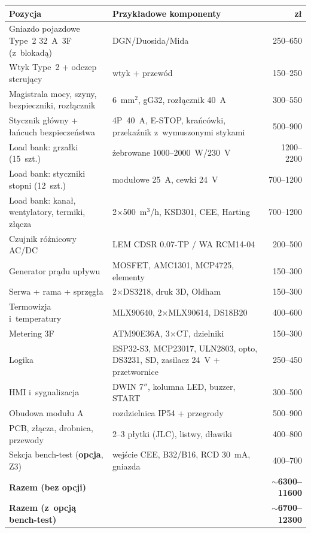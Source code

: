 \documentclass[11pt,a4paper]{article}
\begin{document}
\begin{longtable}{@{}p{}p{}r@{}}
\toprule
\textbf{Pozycja} & \textbf{Przykładowe komponenty} & \textbf{zł} \\
\midrule
\endhead
Gniazdo pojazdowe Type~2 32~A~3F (z~blokadą) & DGN/Duosida/Mida & 250--650 \\
Wtyk Type~2 + odczep sterujący & wtyk + przewód & 150--250 \\
Magistrala mocy, szyny, bezpieczniki, rozłącznik & 6~mm$^2$, gG32, rozłącznik 40~A & 300--550 \\
Stycznik główny + łańcuch bezpieczeństwa & 4P~40~A, E-STOP, krańcówki, przekaźnik z~wymuszonymi stykami & 500--900 \\
Load bank: grzałki (15~szt.) & żebrowane 1000--2000~W/230~V & 1200--2200 \\
Load bank: styczniki stopni (12~szt.) & modułowe 25~A, cewki 24~V & 700--1200 \\
Load bank: kanał, wentylatory, termiki, złącza & 2$\times$500~m$^3$/h, KSD301, CEE, Harting & 700--1200 \\
Czujnik różnicowy AC/DC & LEM CDSR 0.07-TP / WA RCM14-04 & 200--500 \\
Generator prądu upływu & MOSFET, AMC1301, MCP4725, elementy & 150--300 \\
Serwa + rama + sprzęgła & 2$\times$DS3218, druk 3D, Oldham & 150--300 \\
Termowizja i~temperatury & MLX90640, 2$\times$MLX90614, DS18B20 & 400--600 \\
Metering 3F & ATM90E36A, 3$\times$CT, dzielniki & 150--300 \\
Logika & ESP32-S3, MCP23017, ULN2803, opto, DS3231, SD, zasilacz 24~V + przetwornice & 250--450 \\
HMI i~sygnalizacja & DWIN 7$''$, kolumna LED, buzzer, START & 300--500 \\
Obudowa modułu A & rozdzielnica IP54 + przegrody & 500--900 \\
PCB, złącza, drobnica, przewody & 2--3 płytki (JLC), listwy, dławiki & 400--800 \\
Sekcja bench-test (\textbf{opcja}, Z3) & wejście CEE, B32/B16, RCD 30~mA, gniazda & 400--700 \\
\midrule
\textbf{Razem (bez opcji)} & & \textbf{$\sim$6300--11600} \\
\textbf{Razem (z~opcją bench-test)} & & \textbf{$\sim$6700--12300} \\
\bottomrule
\end{longtable}
\end{document}
